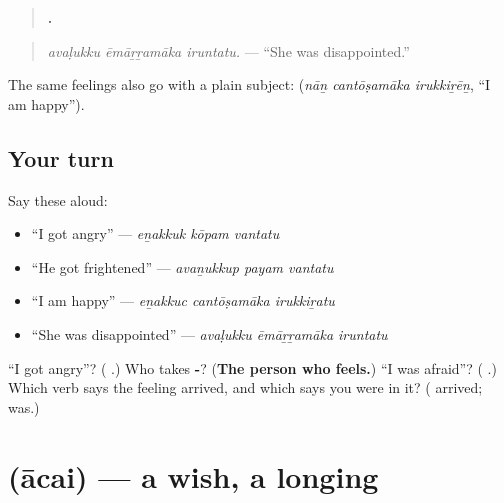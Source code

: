 \begin{quote}
\textbf{  .}
\end{quote}

\begin{quote}
\emph{avaḷukku ēmāṟṟamāka iruntatu.} — \textquotedblleft{}She was disappointed.\textquotedblright{}
\end{quote}

The same feelings also go with a plain subject: \textbf{  } (\emph{nāṉ cantōṣamāka irukkiṟēṉ}, \textquotedblleft{}I am happy\textquotedblright{}).

\subsection*{Your turn}
Say these aloud:

\begin{itemize}
\raggedright
  \item \textquotedblleft{}I got angry\textquotedblright{} — \emph{eṉakkuk kōpam vantatu}
  \item \textquotedblleft{}He got frightened\textquotedblright{} — \emph{avaṉukkup payam vantatu}
  \item \textquotedblleft{}I am happy\textquotedblright{} — \emph{eṉakkuc cantōṣamāka irukkiṟatu}
  \item \textquotedblleft{}She was disappointed\textquotedblright{} — \emph{avaḷukku ēmāṟṟamāka iruntatu}
\end{itemize}

\begin{tcolorbox}[breakable,colback=teal!4,colframe=teal!35!black,title={Before you move on}]
\textquotedblleft{}I got angry\textquotedblright{}? (\textbf{  }.) Who takes \textbf{-}? (\textbf{The person who feels.}) \textquotedblleft{}I was afraid\textquotedblright{}? (\textbf{  }.) Which verb says the feeling arrived, and which says you were in it? (\textbf{} arrived; \textbf{} was.)
\end{tcolorbox}
\section[\texorpdfstring{\ta{ஆசை} (ācai)}{ஆசை (ācai)}]{ (ācai) — a wish, a longing}

\label{lesson:TA-C290-acai}



